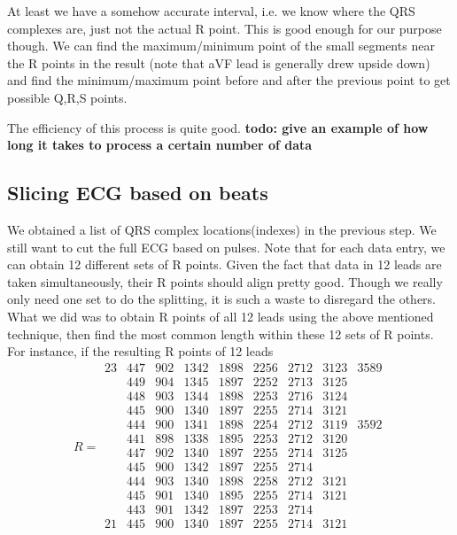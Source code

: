 \documentclass[runningheads]{llncs}
\begin{document}
At least we have a somehow accurate interval, i.e. we know where the QRS complexes are, just not the actual R point. This is good enough for our purpose though. We can find the maximum/minimum point of the small segments near the R points in the result (note that aVF lead is generally drew upside down) and find the minimum/maximum point before and after the previous point to get possible Q,R,S points.

The efficiency of this process is quite good. \textbf{todo: give an example of how long it takes to process a certain number of data}

\subsection{Slicing ECG based on beats}
We obtained a list of QRS complex locations(indexes) in the previous step. We still want to cut the full ECG based on pulses. Note that for each data entry, we can obtain 12 different sets of R points. Given the fact that data in 12 leads are taken simultaneously, their R points should align pretty good. Though we really only need one set to do the splitting, it is such a waste to disregard the others. What we did was to obtain R points of all 12 leads using the above mentioned technique, then find the most common length within these 12 sets of R points. For instance, if the resulting R points of 12 leads 
$$R = \begin{matrix}
23&447&902&1342&1898&2256&2712&3123&3589 \\
&449&904&1345&1897&2252&2713&3125 \\
&448&903&1344&1898&2253&2716&3124 \\
&445&900&1340&1897&2255&2714&3121 \\
&444&900&1341&1898&2254&2712&3119&3592 \\
&441&898&1338&1895&2253&2712&3120 \\
&447&902&1340&1897&2255&2714&3125 \\
&445&900&1342&1897&2255&2714 \\
&444&903&1340&1898&2258&2712&3121 \\
&445&901&1340&1895&2255&2714&3121 \\
&443&901&1342&1897&2253&2714 \\
21&445&900&1340&1897&2255&2714&3121 \\
\end{matrix}
$$
\end{document}
